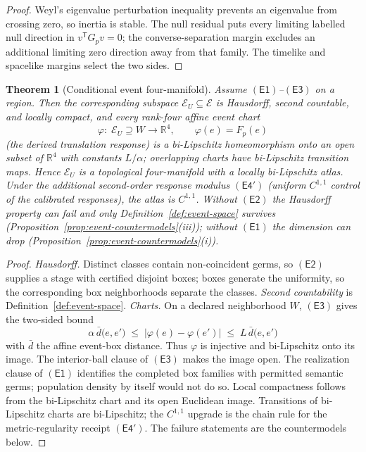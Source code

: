 \documentclass[11pt]{article}
\newtheorem{theorem}{Theorem}[section]
\begin{document}
\begin{proof}
Weyl's eigenvalue perturbation inequality prevents an eigenvalue from crossing zero, so inertia
is stable.  The null residual puts every limiting labelled null direction in
\(v^{\mathsf T}G_pv=0\); the converse-separation margin excludes an additional limiting zero
direction away from that family.  The timelike and spacelike margins select the two sides.
\end{proof}

\begin{theorem}[Conditional event four-manifold]
\label{thm:event-4-manifold}
Assume \(\mathsf{(E1)}\)--\(\mathsf{(E3)}\) on a region. Then the
corresponding subspace \(\mathcal E_U\subseteq\mathcal E\) is Hausdorff,
second countable, and locally compact, and every rank-four affine event chart
\[
\varphi:\;\mathcal E_U\supseteq W\longrightarrow\mathbb R^4,
\qquad
\varphi(e)=F_p(e)
\]
(the derived translation response) is a bi-Lipschitz
homeomorphism onto an open subset of \(\mathbb R^4\) with constants
\(L/\alpha\); overlapping charts have bi-Lipschitz transition maps. Hence
\(\mathcal E_U\) is a topological four-manifold with a locally bi-Lipschitz
atlas. Under the additional second-order response modulus
\(\mathsf{(E4')}\) (uniform \(C^{1,1}\) control of the calibrated responses),
the atlas is \(C^{1,1}\). Without \(\mathsf{(E2)}\) the Hausdorff property can
fail and only Definition~\ref{def:event-space} survives
(Proposition~\ref{prop:event-countermodels}(iii)); without \(\mathsf{(E1)}\)
the dimension can drop
(Proposition~\ref{prop:event-countermodels}(i)).
\end{theorem}

\begin{proof}
\emph{Hausdorff.} Distinct classes contain non-coincident germs, so
\(\mathsf{(E2)}\) supplies a stage with certified disjoint boxes; boxes
generate the uniformity, so the corresponding box neighborhoods separate the
classes. \emph{Second countability} is
Definition~\ref{def:event-space}. \emph{Charts.} On a declared neighborhood \(W\),
\(\mathsf{(E3)}\) gives the two-sided bound
\[
\alpha\,\bar d\bigl(e,e'\bigr)\;\leq\;
\bigl|\varphi(e)-\varphi(e')\bigr|\;\leq\;
L\,\bar d\bigl(e,e'\bigr)
\]
with \(\bar d\) the affine event-box distance. Thus
\(\varphi\) is injective and bi-Lipschitz onto its image. The interior-ball
clause of \(\mathsf{(E3)}\) makes the image open. The realization clause of
\(\mathsf{(E1)}\) identifies the completed box families with permitted semantic
germs; population density by itself would not do so. Local compactness
follows from the bi-Lipschitz chart and its open Euclidean image. Transitions of bi-Lipschitz charts are
bi-Lipschitz; the \(C^{1,1}\) upgrade is the chain rule for the
metric-regularity receipt \(\mathsf{(E4')}\).
The failure statements are the countermodels below.
\end{proof}
\end{document}
